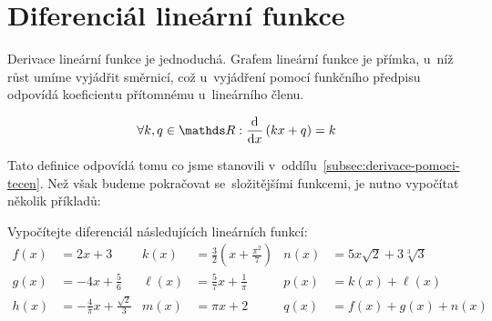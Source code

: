 \section{Diferenciál lineární funkce}
\label{sec:diferencial-linearni-funkce}

Derivace lineární funkce je jednoduchá. Grafem lineární funkce je přímka, u~níž růst
umíme vyjádřit směrnicí, což u~vyjádření pomocí funkčního předpisu odpovídá
koeficientu přítomnému u~lineárního členu.

\begin{lemma}
    \begin{equation*}
        \forall k, q \in \reals: \fracdiff{}{x} \left( kx + q \right) = k
    \end{equation*}
\end{lemma}

Tato definice odpovídá tomu co jsme stanovili
v~oddílu~\ref{subsec:derivace-pomoci-tecen}. Než však budeme pokračovat
se~složitějšími funkcemi, je nutno vypočítat několik příkladů:

\begin{exercise}
    Vypočítejte diferenciál následujících lineárních funkcí:
    \begin{align*}
        f(x) &= 2x + 3
        & k(x) &= \frac{3}{2} \left( x + \frac{\pi^2}{7} \right)
        & n(x) &= 5x \sqrt{2} + 3 \sqrt[3]{3} \\
        g(x) &= -4x + \frac{5}{6}
        & \ell(x) &= \frac{5}{7}x + \frac{1}{\pi}
        & p(x) &= k(x) + \ell(x) \\
        h(x) &= -\frac{4}{\pi}x + \frac{\sqrt{2}}{3}
        & m(x) &= \pi x + 2
        & q(x) &= f(x) + g(x) + n(x)
    \end{align*}
\end{exercise}